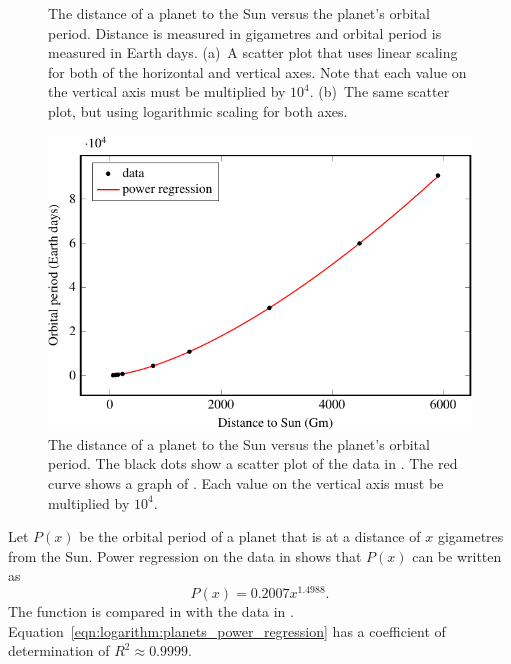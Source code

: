 \documentclass[a4paper,oneside,12pt]{article}
\begin{document}
{\begin{solution}
\begin{figure}[!htbp]
{  \label{subfig:logarithm:planets_log}
}
\caption{%
  The distance of a planet to the Sun versus the planet's orbital
  period.  Distance is measured in gigametres and orbital period is
  measured in Earth days.  (a)~A scatter plot that uses linear scaling
  for both of the horizontal and vertical axes.  Note that each value
  on the vertical axis must be multiplied by $10^4$.  (b)~The same
  scatter plot, but using logarithmic scaling for both axes.
}
\label{fig:logarithm:planets}
\end{figure}

\begin{figure}[!htbp]
\centering
\includegraphics[scale=1.1]{image/12/planets.pdf}
\caption{%
  The distance of a planet to the Sun versus the planet's orbital
  period.  The black dots show a scatter plot of the data in
  .  The red curve shows a graph
  of .  Each value on
  the vertical axis must be multiplied by $10^4$.
}
\label{fig:logarithm:planets_regression}
\end{figure}

Let $P(x)$ be the orbital period of a planet that is at a distance of
$x$ gigametres from the Sun.  Power regression on the data in
 shows that $P(x)$ can be written
as
\begin{equation}
\label{eqn:logarithm:planets_power_regression}
P(x)
=
0.2007 x^{1.4988}.
\end{equation}
The function is compared in 
with the data in .
Equation~\eqref{eqn:logarithm:planets_power_regression} has a
coefficient of determination of $R^2 \approx 0.9999$.


\end{solution}}
\end{document}
